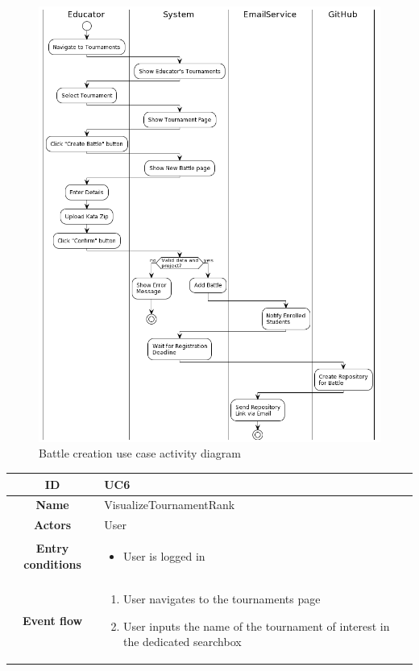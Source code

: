 \begin{center}
\begin{figure}[H]
        \includegraphics[scale=0.5]{Diagrams/activity_createbattle.png}
        \caption{Battle creation use case activity diagram}
    \end{figure}
    \begin{tabular}{ |c|m{10cm}| }
        \hline
        \textbf{ID} & UC6 \\
        \hline
        \textbf{Name} & VisualizeTournamentRank \\
        \hline
        \textbf{Actors} & User \\
        \hline
        \textbf{Entry conditions} &
        \begin{itemize}
            \item User is logged in
        \end{itemize} \\
        \hline
        \textbf{Event flow} &
        \begin{enumerate}
            \item User navigates to the tournaments page
            \item User inputs the name of the tournament of interest in the dedicated searchbox

\end{enumerate}
\end{tabular}
\end{center}
